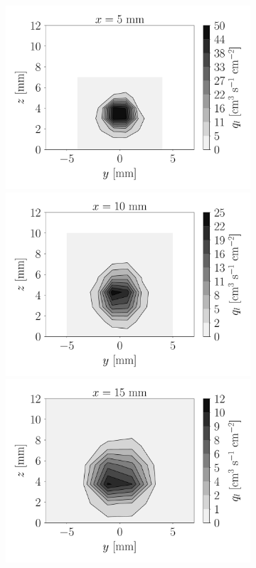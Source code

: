 \begin{figure}[ht]
\begin{subfigure}[b]{1.1\textwidth}
	\flushleft
   \includegraphics[scale=0.225]{./part2_developments/figures_ch5_resolved_JICF/flow_rates_ibs/spatial_maps/UG75_DX20_x05mm_volume_flux}
   \includegraphics[scale=0.225]{./part2_developments/figures_ch5_resolved_JICF/flow_rates_ibs/spatial_maps/UG75_DX20_x10mm_volume_flux}
   \includegraphics[scale=0.225]{./part2_developments/figures_ch5_resolved_JICF/flow_rates_ibs/spatial_maps/UG75_DX20_x15mm_volume_flux}

\end{subfigure}
\end{figure}
